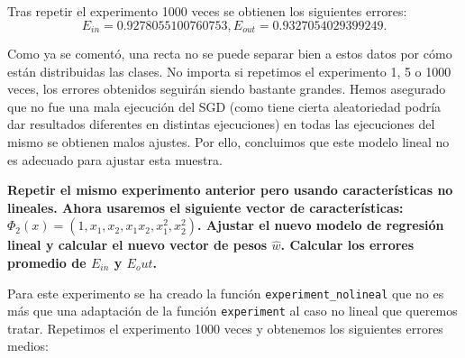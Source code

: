 \documentclass[a4paper, 20pt]{article}
\begin{document}
Tras repetir el experimento 1000 veces se obtienen los siguientes errores:\[
E_{in} = 0.9278055100760753,
E_{out} = 0.9327054029399249.\]

Como ya se comentó, una recta no se puede separar bien a estos datos por cómo están distribuidas las clases. No importa si repetimos el experimento 1, 5 o 1000 veces, los errores obtenidos seguirán siendo bastante grandes. Hemos asegurado que no fue una mala ejecución del SGD (como tiene cierta aleatoriedad podría dar resultados diferentes en distintas ejecuciones) en todas las ejecuciones del mismo se obtienen malos ajustes. Por ello, concluimos que este modelo lineal no es adecuado para ajustar esta muestra.

\textbf{Repetir el mismo experimento anterior pero usando características no lineales. Ahora usaremos el siguiente vector de características: $\Phi_2 (x) = (1, x_1 , x_2 , x_1 x_2 , x^2_1, x^ 2_2)$. Ajustar el nuevo modelo de regresión lineal y calcular el nuevo vector de pesos $\hat{w}$. Calcular los errores promedio de $E_{in}$ y $E_out$.}

Para este experimento se ha creado la función \texttt{experiment\_nolineal} que no es más que una adaptación de la función \texttt{experiment} al caso no lineal que queremos tratar. Repetimos el experimento 1000 veces y obtenemos los siguientes errores medios:\[

\]




\newpage
\printbibliography
\end{document}
